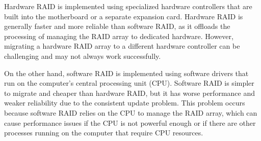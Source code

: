 Hardware RAID is implemented using specialized hardware controllers that are built into the motherboard or a separate expansion card. 
Hardware RAID is generally faster and more reliable than software RAID, as it offloads the processing of managing the RAID array to dedicated hardware. 
However, migrating a hardware RAID array to a different hardware controller can be challenging and may not always work successfully.

On the other hand, software RAID is implemented using software drivers that run on the computer's central processing unit (CPU). 
Software RAID is simpler to migrate and cheaper than hardware RAID, but it has worse performance and weaker reliability due to the consistent update problem. 
This problem occurs because software RAID relies on the CPU to manage the RAID array, which can cause performance issues if the CPU is not powerful enough or if there are other processes running on the computer that require CPU resources.